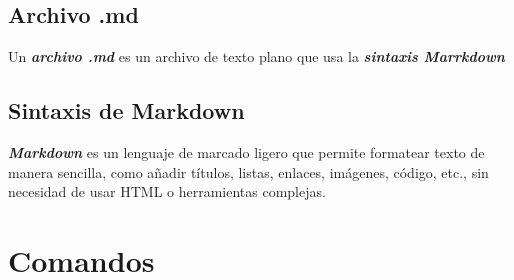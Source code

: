 \documentclass[10pt,a4paper]{book}
\begin{document}
\section{Archivo .md}
Un \textbf{\textit{archivo .md}} es un archivo de texto plano que usa la \textbf{\textit{sintaxis Marrkdown}}

\section{Sintaxis de Markdown}
\textbf{\textit{Markdown}} es un lenguaje de marcado ligero que permite formatear texto de manera sencilla, como añadir títulos, listas, enlaces, imágenes, código, etc., sin necesidad de usar HTML o herramientas complejas.

\newpage
\chapter{Comandos}
\end{document}
